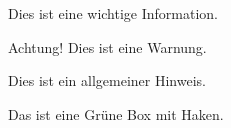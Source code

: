 
\begin{importantinfo}
    Dies ist eine wichtige Information.
\end{importantinfo}

\begin{warningbox}
    Achtung! Dies ist eine Warnung.
\end{warningbox}

\begin{hintbox}
    Dies ist ein allgemeiner Hinweis.
\end{hintbox}

\begin{greenbox}
    Das ist eine Grüne Box mit Haken.
\end{greenbox}